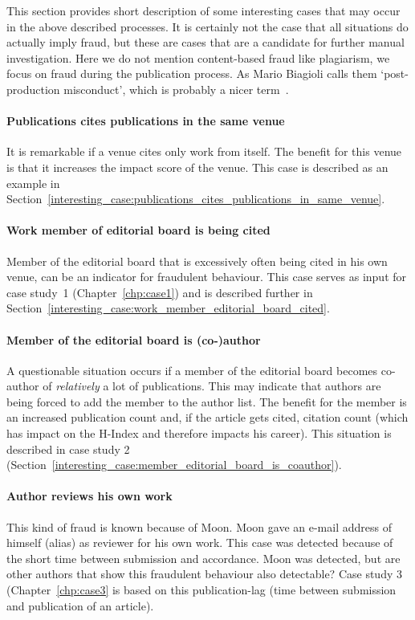 \documentclass{ou-report}
\begin{document}
This section provides short description of some interesting cases that may 
occur in the above described processes.
It is certainly not the case that all situations do actually imply fraud, but 
these are cases that are a candidate for further manual investigation.
Here we do not mention content-based fraud like plagiarism, we focus on fraud
during the publication process. As Mario Biagioli calls them `post-production 
misconduct', which is probably a nicer term~\cite{biagioli2020gaming}.

\paragraph{Publications cites publications in the same venue} It is remarkable
if a venue cites only work from itself. The benefit for this venue is that it
increases the impact score of the venue. This case is described as an example in
Section~\ref{interesting_case:publications_cites_publications_in_same_venue}.
\paragraph{Work member of editorial board is being cited} Member of the
editorial board that is excessively often being cited in his own venue, can be
an indicator for fraudulent behaviour. This case serves as input for case 
study~1 (Chapter~\ref{chp:case1}) and is described further in 
Section~\ref{interesting_case:work_member_editorial_board_cited}.
\paragraph{Member of the editorial board is (co-)author} 
A questionable situation occurs if a member of the editorial board becomes 
co-author of \textit{relatively} a lot of publications. This may indicate that 
authors are being forced to add the member to the author list. The benefit for
the member is an increased publication count and, if the article gets cited, 
citation count (which has impact on the H-Index and therefore impacts his 
career). This situation is described in case study 2
(Section~\ref{interesting_case:member_editorial_board_is_coauthor}).

\paragraph{Author reviews his own work}
This kind of fraud is known because of Moon. Moon gave an e-mail address of 
himself (alias) as reviewer for his own work. This case was detected because of
the short time between submission and accordance. Moon was detected, but are 
other authors that show this fraudulent behaviour also detectable?
Case study 3 (Chapter~\ref{chp:case3} is based on this publication-lag (time 
between submission and publication of an article).
\end{document}
